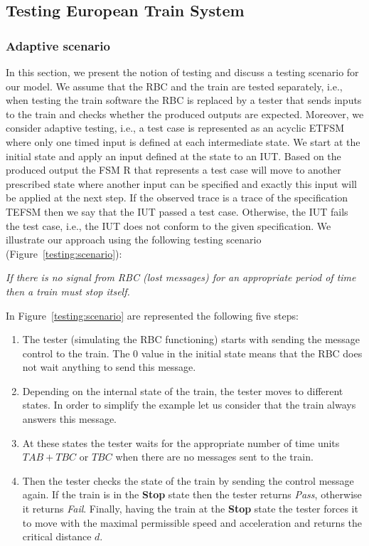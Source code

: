 \documentclass{template/openetcs_article}
\begin{document}
\subsection{Testing European Train System}\label{sec5}

\subsubsection{Adaptive scenario} 

In this section, we present the notion of testing and discuss a testing scenario for our model. We assume that the RBC and the train are tested separately, i.e., when testing the train software the RBC is replaced by a tester that sends inputs to the train and checks whether the produced outputs are expected. Moreover, we consider adaptive testing, i.e., a test case is represented as an acyclic ETFSM~\cite{Petrenko2011,offutt1989coupling} where only one timed input is defined at each intermediate state. We start at the initial state and apply an input defined at the state to an IUT. Based on the produced output the FSM R that represents a test case will move to another prescribed state where another input can be specified and exactly this input will be applied at the next step.  If the observed trace is a trace of the specification TEFSM then we say that the IUT passed a test case. Otherwise, the IUT fails the test case, i.e., the IUT does not conform to the given specification. We illustrate our approach using the following testing scenario (Figure~\ref{testing:scenario}):



\textit{If there is no signal from RBC (lost messages) for an appropriate period of time then a train must stop itself.}

In Figure~\ref{testing:scenario} are represented the following five steps:

\begin{enumerate}
\item The tester (simulating the RBC functioning) starts with sending the message control to the train. The 0 value in the initial state means that the RBC does not wait anything to send this message.
\item Depending on the internal state of the train, the tester moves to different states. In order to simplify the example let us consider that the train always answers this message.
\item At these states the tester waits for the appropriate number of time units $TAB + TBC$ or $TBC$ when there are no messages sent to the train.
\item Then the tester checks the state of the train by sending the control message again.
 If the train is in the \textbf{Stop} state then the tester returns \textit{Pass}, otherwise it returns \textit{Fail}. Finally, having the train at the \textbf{Stop} state the tester forces it to move with the maximal permissible speed and acceleration and returns the critical distance $d$.
\end{enumerate}
 
\end{document}
